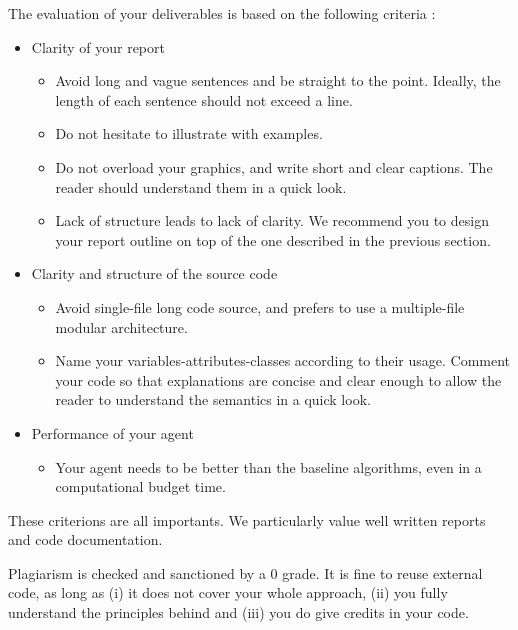 \documentclass[12pt,a4paper,BCOR12mm, headexclude, footexclude, twoside, openright]{scrartcl}
\newcommand*{\TakeFourierOrnament}[1]{{%
\fontencoding{U}\fontfamily{futs}\selectfont\char#1}}
\newcommand*{\danger}{\TakeFourierOrnament{66}}
\numberwithin{equation}{section} %
\numberwithin{figure}{section} %
\numberwithin{table}{section} %
\begin{document}
The evaluation of your deliverables is based on the following criteria :

\begin{itemize}
 \item Clarity of your report
 \begin{itemize}
     \item Avoid long and vague sentences and be straight to the point. Ideally, the length of each sentence should not exceed a line.
     \item Do not hesitate to illustrate with examples.
     \item Do not overload your graphics, and write short and clear captions. The reader should understand them in a quick look.
     \item Lack of structure leads to lack of clarity. We recommend you to design your report outline on top of the one described in the previous section.
 \end{itemize}
 

 \item Clarity and structure of the source code
 \begin{itemize}
     \item Avoid single-file long code source, and prefers to use a multiple-file modular architecture. 
     \item Name your variables-attributes-classes according to their usage. Comment your code so that explanations are concise and clear enough to allow the reader to understand the semantics in a quick look.
 \end{itemize}
 
  \item Performance of your agent
 \begin{itemize}
     \item Your agent needs to be better than the baseline algorithms, even in a computational budget time.
 \end{itemize}
\end{itemize}

These criterions are all importants. We particularly value well written reports and code documentation. 

\danger Plagiarism is checked and sanctioned by a 0 grade. It is fine to reuse external code, as long as (i) it does not cover your whole approach, (ii) you fully understand the principles behind and (iii) you do give credits in your code.
\end{document}
